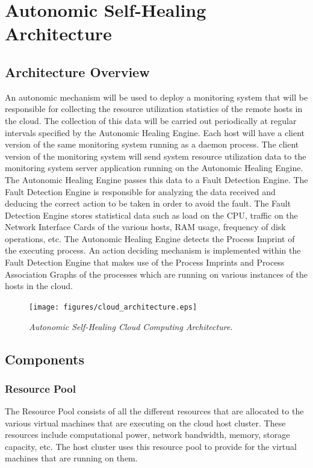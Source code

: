\chapter{Autonomic Self-Healing Architecture}
\section{Architecture Overview}
An autonomic mechanism will be used to deploy a monitoring system that will be responsible for collecting the resource utilization statistics of the remote hosts in the cloud. The collection of this data will be carried out periodically at regular intervals specified by the Autonomic Healing Engine. Each host will have a client version of the same monitoring system running as a daemon process. The client version of the monitoring system will send system resource utilization data to the monitoring system server application running on the Autonomic Healing Engine. The Autonomic Healing Engine passes this data to a Fault Detection Engine. The Fault Detection Engine is responsible for analyzing the data received and deducing the correct action to be taken in order to avoid the fault. The Fault Detection Engine stores statistical data such as load on the CPU, traffic on the Network Interface Cards of the various hosts, RAM usage, frequency of disk operations, etc. The Autonomic Healing Engine detects the Process Imprint of the executing process. An action deciding mechanism is implemented within the Fault Detection Engine that makes use of the Process Imprints and Process Association Graphs of the processes which are running on various instances of the hosts in the cloud.
	\begin{figure}[t]
		\begin{center}
			\texttt{[image: figures/cloud\_architecture.eps]} 
			\caption{\small \sl Autonomic Self-Healing Cloud Computing Architecture.\label{fig:Label6}} 
		\end{center} 
	\end{figure}
\section{Components}
\subsection{Resource Pool}
The Resource Pool consists of all the different resources that are allocated to the various virtual machines that are executing on the cloud host cluster. These resources include computational power, network bandwidth, memory, storage capacity, etc. The host cluster uses this resource pool to provide for the virtual machines that are running on them.
